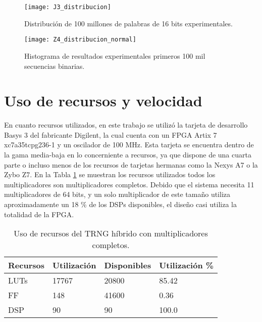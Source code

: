         \begin{figure}[hbtp]
            \centering
            \texttt{[image: J3\_distribucion]}
            \caption{Distribución de 100 millones de palabras de 16 bits experimentales.}
            \label{fig:J3_distribucion}
        \end{figure}


        \begin{figure}[hbtp]
            \centering
            \texttt{[image: Z4\_distribucion\_normal]}
            \caption{Histograma de resultados experimentales primeros 100 mil secuencias binarias.}
            \label{fig:J4_distribucion}
        \end{figure}



    \section{Uso de recursos y velocidad}

        En cuanto recursos utilizados, en este trabajo se utilizó la tarjeta de desarrollo Basys 3 del fabricante Digilent, la cual cuenta con un FPGA Artix 7 xc7a35tcpg236-1 y un oscilador de 100 MHz. Esta tarjeta se encuentra dentro de la gama media-baja en lo concerniente a recursos, ya que dispone de una cuarta parte o incluso menos de los recursos de tarjetas hermanas como la Nexys A7 o la Zybo Z7. En la Tabla \ref{tab:recursos} se muestran los recursos utilizados todos los multiplicadores son multiplicadores completos. Debido que el sistema necesita 11 multiplicadores de 64 bits, y un solo multiplicador de este tamaño utiliza aproximadamente un 18 \% de los DSPs disponibles, el diseño casi utiliza la totalidad de la FPGA. 

        \begin{table}[htbp]
            \centering
            \caption{Uso de recursos del TRNG híbrido con multiplicadores completos.}
            \begin{tabular}{|l|l|l|l|}
                \hline
                \rowcolor{lightgray} Recursos  & Utilización & Disponibles & Utilización \% \\
                \hline
                LUTs      & 17767  & 20800    & 85.42  \\
                \hline
                FF     &  148 & 41600   & 0.36 \\
                \hline
                DSP       & 90  & 90   & 100.0 \\
                \hline
            \end{tabular}
            \label{tab:recursos}
        \end{table}

